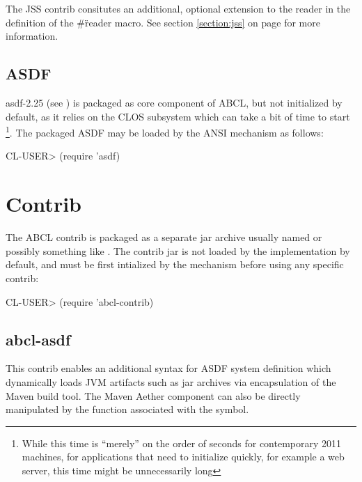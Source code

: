 \documentclass[10pt]{book}
\begin{document}
The JSS contrib consitutes an additional, optional extension to the
reader in the definition of the \#\" reader macro.  See section
\ref{section:jss} on page \pageref{section:jss} for more information.

\section{ASDF}

asdf-2.25 (see \cite{asdf}) is packaged as core component of ABCL,
but not initialized by default, as it relies on the CLOS subsystem
which can take a bit of time to start \footnote{While this time is
  ``merely'' on the order of seconds for contemporary 2011 machines,
  for applications that need to initialize quickly, for example a web
  server, this time might be unnecessarily long}.  The packaged ASDF
may be loaded by the \textsc{ANSI}  mechanism as
follows:

\begin{listing-lisp}
CL-USER> (require 'asdf)
\end{listing-lisp}

\chapter{Contrib}

The ABCL contrib is packaged as a separate jar archive usually named
 or possibly something like
.  The contrib jar is not loaded by the
implementation by default, and must be first intialized by the
 mechanism before using any specific contrib:

\begin{listing-lisp}
CL-USER> (require 'abcl-contrib)
\end{listing-lisp}

\section{abcl-asdf}

This contrib enables an additional syntax for \textsc{ASDF} system
definition which dynamically loads \textsc{JVM} artifacts such as jar
archives via encapsulation of the Maven build tool.  The Maven Aether
component can also be directly manipulated by the function associated
with the  symbol.

\end{document}
